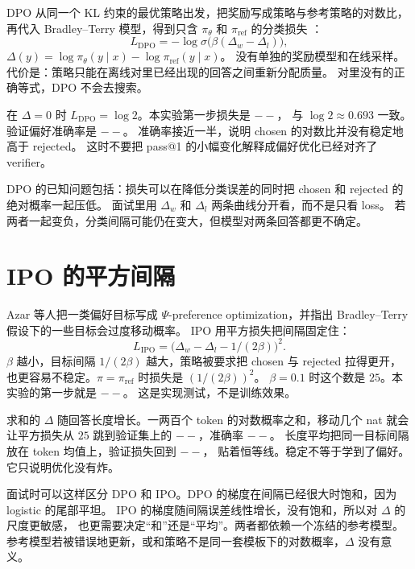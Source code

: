 \documentclass[10pt,twocolumn,a4paper]{ctexart}
\providecommand{\IpoLossStart}{--}\providecommand{\IpoEvalLoss}{--}
\providecommand{\IpoEvalAcc}{--}\providecommand{\DpoLossStart}{--}
\providecommand{\DpoEvalAcc}{--}\providecommand{\IpoMeanEvalLoss}{--}
\begin{document}
DPO 从同一个 KL 约束的最优策略出发，把奖励写成策略与参考策略的对数比，
再代入 Bradley--Terry 模型，得到只含 $\pi_\theta$ 和 $\pi_{\mathrm{ref}}$ 的分类损失
\citep{rafailov2023dpo}：
\begin{equation}
L_{\mathrm{DPO}}=-\log\sigma\bigl(\beta(\Delta_w-\Delta_l)\bigr),
\end{equation}
$\Delta(y)=\log\pi_\theta(y\mid x)-\log\pi_{\mathrm{ref}}(y\mid x)$。
没有单独的奖励模型和在线采样。代价是：策略只能在离线对里已经出现的回答之间重新分配质量。
对里没有的正确等式，DPO 不会去搜索。

在 $\Delta=0$ 时 $L_{\mathrm{DPO}}=\log 2$。本实验第一步损失是 $\DpoLossStart$，
与 $\log 2\approx 0.693$ 一致。验证偏好准确率是 $\DpoEvalAcc$。
准确率接近一半，说明 chosen 的对数比并没有稳定地高于 rejected。
这时不要把 pass@1 的小幅变化解释成偏好优化已经对齐了 verifier。

DPO 的已知问题包括：损失可以在降低分类误差的同时把 chosen 和 rejected 的绝对概率一起压低。
面试里用 $\Delta_w$ 和 $\Delta_l$ 两条曲线分开看，而不是只看 loss。
若两者一起变负，分类间隔可能仍在变大，但模型对两条回答都更不确定。

\section{IPO 的平方间隔}
Azar 等人把一类偏好目标写成 $\Psi$-preference optimization，并指出
Bradley--Terry 假设下的一些目标会过度移动概率\citep{azar2024ipo}。
IPO 用平方损失把间隔固定住：
\begin{equation}
L_{\mathrm{IPO}}=\bigl(\Delta_w-\Delta_l-1/(2\beta)\bigr)^2.
\end{equation}
$\beta$ 越小，目标间隔 $1/(2\beta)$ 越大，策略被要求把 chosen 与 rejected 拉得更开，
也更容易不稳定。$\pi=\pi_{\mathrm{ref}}$ 时损失是 $(1/(2\beta))^2$。
$\beta=0.1$ 时这个数是 $25$。本实验的第一步就是 $\IpoLossStart$。
这是实现测试，不是训练效果。

求和的 $\Delta$ 随回答长度增长。一两百个 token 的对数概率之和，移动几个 nat
就会让平方损失从 $25$ 跳到验证集上的 $\IpoEvalLoss$，准确率 $\IpoEvalAcc$。
长度平均把同一目标间隔放在 token 均值上，验证损失回到 $\IpoMeanEvalLoss$，
贴着恒等线。稳定不等于学到了偏好。它只说明优化没有炸。

面试时可以这样区分 DPO 和 IPO。DPO 的梯度在间隔已经很大时饱和，因为 logistic 的尾部平坦。
IPO 的梯度随间隔误差线性增长，没有饱和，所以对 $\Delta$ 的尺度更敏感，
也更需要决定``和''还是``平均''。两者都依赖一个冻结的参考模型。
参考模型若被错误地更新，或和策略不是同一套模板下的对数概率，$\Delta$ 没有意义。
\end{document}
